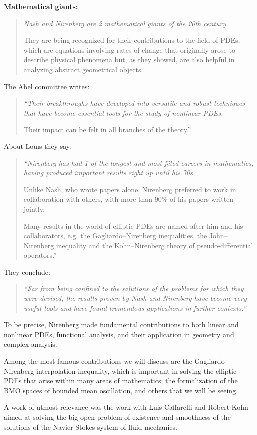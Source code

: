 \documentclass{article}
\begin{document}
\textbf{Mathematical giants:}
\begin{quotation}\it
	Nash and Nirenberg are 2 mathematical giants of the 20th century.
	
	They are being recognized for their contributions to the field of PDEs, which are equations involving rates of change that originally arose to describe physical phenomena but, as they showed, are also helpful in analyzing abstract geometrical objects.
\end{quotation}
The Abel committee writes:
\begin{quotation}\it
	``Their breakthroughs have developed into versatile and robust techniques that have become essential tools for the study of nonlinear PDEs.
	
	Their impact can be felt in all branches of the theory.''
\end{quotation}
About Louis they say:
\begin{quotation}\it
	``Nirenberg has had 1 of the longest and most f\^eted careers in mathematics, having produced important results right up until his 70s.
	
	Unlike Nash, who wrote papers alone, Nirenberg preferred to work in collaboration with others, with more than 90\% of his papers written jointly.
	
	Many results in the world of elliptic PDEs are named after him and his collaborators, e.g. the Gagliardo--Nirenberg inequalities, the John--Nirenberg inequality and the Kohn--Nirenberg theory of pseudo-differential operators.''
\end{quotation}
They conclude:
\begin{quotation}\it
	``Far from being confined to the solutions of the problems for which they were devised, the results proven by Nash and Nirenberg have become very useful tools and have found tremendous applications in further contexts.''
\end{quotation}
To be precise, Nirenberg made fundamental contributions to both linear and nonlinear PDEs, functional analysis, and their application in geometry and complex analysis.

Among the most famous contributions we will discuss are the Gagliardo-Nirenberg interpolation inequality, which is important in solving the elliptic PDEs that arise within many areas of mathematics; the formalization of the BMO spaces of bounded mean oscillation, and others that we will be seeing.

%
A work of utmost relevance was the work with Luis Caffarelli and Robert Kohn aimed at solving the big open problem of existence and smoothness of the solutions of the Navier-Stokes system of fluid mechanics.
\end{document}
